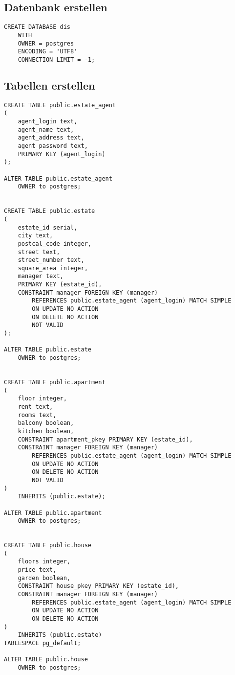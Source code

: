\documentclass[ngerman]{dis-template-add}
\begin{document}
\subsection*{Datenbank erstellen}

\begin{verbatim}
CREATE DATABASE dis
    WITH 
    OWNER = postgres
    ENCODING = 'UTF8'
    CONNECTION LIMIT = -1;
\end{verbatim}


\subsection*{Tabellen erstellen}

\begin{verbatim}
CREATE TABLE public.estate_agent
(
    agent_login text,
    agent_name text,
    agent_address text,
    agent_password text,
    PRIMARY KEY (agent_login)
);

ALTER TABLE public.estate_agent
    OWNER to postgres;
    

CREATE TABLE public.estate
(
    estate_id serial,
    city text,
    postcal_code integer,
    street text,
    street_number text,
    square_area integer,
    manager text,
    PRIMARY KEY (estate_id),
    CONSTRAINT manager FOREIGN KEY (manager)
        REFERENCES public.estate_agent (agent_login) MATCH SIMPLE
        ON UPDATE NO ACTION
        ON DELETE NO ACTION
        NOT VALID
);

ALTER TABLE public.estate
    OWNER to postgres;


CREATE TABLE public.apartment
(
    floor integer,
    rent text,
    rooms text,
    balcony boolean,
    kitchen boolean,
    CONSTRAINT apartment_pkey PRIMARY KEY (estate_id),
    CONSTRAINT manager FOREIGN KEY (manager)
        REFERENCES public.estate_agent (agent_login) MATCH SIMPLE
        ON UPDATE NO ACTION
        ON DELETE NO ACTION
        NOT VALID
)
    INHERITS (public.estate);

ALTER TABLE public.apartment
    OWNER to postgres;


CREATE TABLE public.house
(
    floors integer,
    price text,
    garden boolean,
    CONSTRAINT house_pkey PRIMARY KEY (estate_id),
    CONSTRAINT manager FOREIGN KEY (manager)
        REFERENCES public.estate_agent (agent_login) MATCH SIMPLE
        ON UPDATE NO ACTION
        ON DELETE NO ACTION
)
    INHERITS (public.estate)
TABLESPACE pg_default;

ALTER TABLE public.house
    OWNER to postgres;



\end{verbatim}
\end{document}
